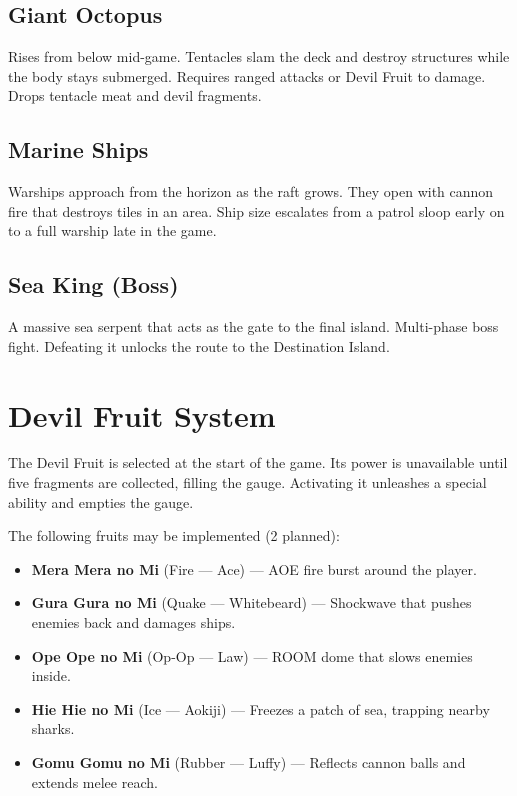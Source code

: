 \documentclass[12pt, a4paper]{article}
\begin{document}
\subsection{Giant Octopus}
Rises from below mid-game. Tentacles slam the deck and destroy structures while the body stays submerged.
Requires ranged attacks or Devil Fruit to damage. Drops tentacle meat and devil fragments.

\subsection{Marine Ships}
Warships approach from the horizon as the raft grows. They open with cannon fire that destroys tiles in an
area. Ship size escalates from a patrol sloop early on to a full warship late in the game.

\subsection{Sea King (Boss)}
A massive sea serpent that acts as the gate to the final island. Multi-phase boss fight. Defeating it unlocks
the route to the Destination Island.

\section{Devil Fruit System}

The Devil Fruit is selected at the start of the game. Its power is unavailable until five fragments are
collected, filling the gauge. Activating it unleashes a special ability and empties the gauge.

The following fruits may be implemented (2 planned):

\begin{itemize}[leftmargin=1.5em]
  \item \textbf{Mera Mera no Mi} (Fire --- Ace) --- AOE fire burst around the player.
  \item \textbf{Gura Gura no Mi} (Quake --- Whitebeard) --- Shockwave that pushes enemies back and damages ships.
  \item \textbf{Ope Ope no Mi} (Op-Op --- Law) --- ROOM dome that slows enemies inside.
  \item \textbf{Hie Hie no Mi} (Ice --- Aokiji) --- Freezes a patch of sea, trapping nearby sharks.
  \item \textbf{Gomu Gomu no Mi} (Rubber --- Luffy) --- Reflects cannon balls and extends melee reach.
\end{itemize}
\end{document}
